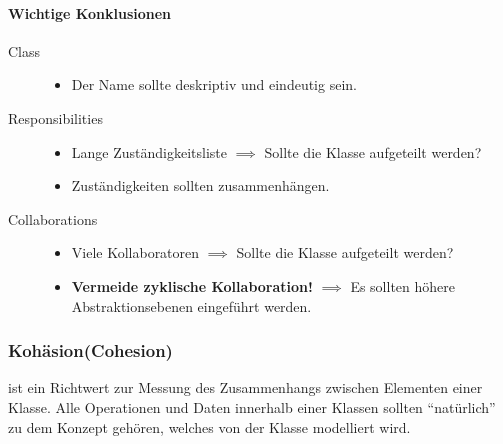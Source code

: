 \documentclass[
    ngerman,
    color=3b,
    summary,
    boxarc,
    main,
]{rubos-tuda-template}
\begin{document}

\paragraph{Wichtige Konklusionen}\mbox{}\par
\begin{description}
    \item[Class]
          \begin{itemize}
              \item Der Name sollte deskriptiv und eindeutig sein.
          \end{itemize}
    \item[Responsibilities]
          \begin{itemize}
              \item Lange Zuständigkeitsliste  $ \implies $ Sollte die Klasse aufgeteilt werden?
              \item Zuständigkeiten sollten zusammenhängen.
          \end{itemize}
    \item[Collaborations]
          \begin{itemize}
              \item Viele Kollaboratoren $ \implies $ Sollte die Klasse aufgeteilt werden?
              \item \textbf{Vermeide zyklische Kollaboration!} $ \implies $ Es sollten höhere Abstraktionsebenen eingeführt werden.
          \end{itemize}
\end{description}

\subsubsection{Kohäsion(Cohesion)}
\begin{definition}[Kohäsion]
    ist ein Richtwert zur Messung des Zusammenhangs zwischen Elementen einer Klasse. Alle Operationen und Daten innerhalb einer Klassen sollten \enquote{natürlich} zu dem Konzept gehören, welches von der Klasse modelliert wird.
\end{definition}
\end{document}
